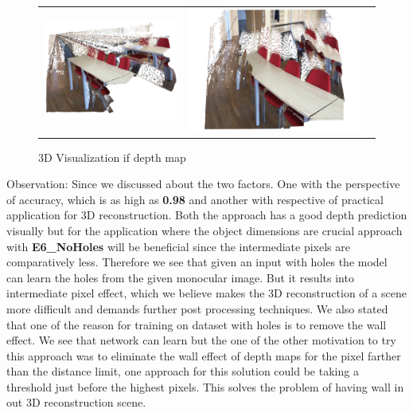  \begin{figure}[!]
%
\centering\begin{tabular}{c@{ }c@{ }c@{ }}
\includegraphics[width=.5\linewidth]{Figures/results/3D/holes001.png}&
\includegraphics[width=.5\linewidth]{Figures/results/3D/noholes002.png}\\[-1ex]
\end{tabular}
\caption{3D Visualization if depth map}
\label{fig:3drecon}
\end{figure}

Observation: Since we discussed about the two factors. One with the perspective of accuracy, which is as high as \textbf{0.98} and another with respective of practical application for 3D reconstruction. Both the approach has a good depth prediction visually but for the application where the object dimensions are crucial approach with \textbf{E6\_NoHoles} will be beneficial since the intermediate pixels are comparatively less. 
Therefore we see that given an input with holes the model can learn the holes from the given monocular image. But it results into intermediate pixel effect, which we believe makes the 3D reconstruction of a scene more difficult and demands further post processing techniques. We also stated that one of the reason for training on dataset with holes is to remove the wall effect. We see that network can learn but the one of the other motivation to try this approach was to eliminate the wall effect of depth maps  for the pixel farther than the distance limit, one approach for this solution could be taking a threshold just before the highest pixels. This solves the problem of having wall in out 3D reconstruction scene.\\


